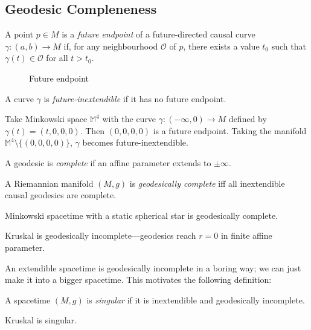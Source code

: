 \subsection{Geodesic Compleneness}%
\label{sub:geodesic_compleneness}

\begin{definition}
  A point $p \in M$ is a \emph{future endpoint} of a future-directed causal curve $\gamma \colon (a, b) \to M$ if, for any neighbourhood $\mathcal{O}$ of $p$, there exists a value $t_0$ such that $\gamma(t) \in \mathcal{O}$ for all $t > t_0$.
\end{definition}
\begin{figure}[tbhp]
  \centering
  \def\svgwidth{0.25\columnwidth}
  
  \caption{Future endpoint}
  \label{fig:l6f3}
\end{figure}
\begin{definition}
  A curve $\gamma$ is \emph{future-inextendible} if it has no future endpoint.
\end{definition}

\begin{example}[]
  Take Minkowski space $\mathbb{M}^4$ with the curve $\gamma \colon (-\infty, 0) \to M$ defined by $\gamma(t) = (t, 0, 0, 0)$. Then $(0,0,0,0)$ is a future endpoint.
  Taking the manifold $\mathbb{M}^4 \setminus \{(0,0,0,0)\}$, $\gamma$ becomes future-inextendible.
\end{example}

\begin{definition}[complete]
  A geodesic is \emph{complete} if an affine parameter extends to $\pm \infty$.
\end{definition}
\begin{definition}
  A Riemannian manifold $(M, g)$ is \emph{geodesically complete} iff all inextendible causal geodesics are complete.
\end{definition}
\begin{example}[]
  Minkowski spacetime with a static spherical star is geodesically complete.
\end{example}
\begin{example}[]
  Kruskal is geodesically incomplete---geodesics reach $r = 0$ in finite affine parameter.
\end{example}

An extendible spacetime is geodesically incomplete in a boring way; we can just make it into a bigger spacetime.
This motivates the following definition:
\begin{definition}[singular]
  A spacetime $(M, g)$ is \emph{singular} if it is inextendible and geodesically incomplete.
\end{definition}
\begin{example}[]
  Kruskal is singular.
\end{example}

